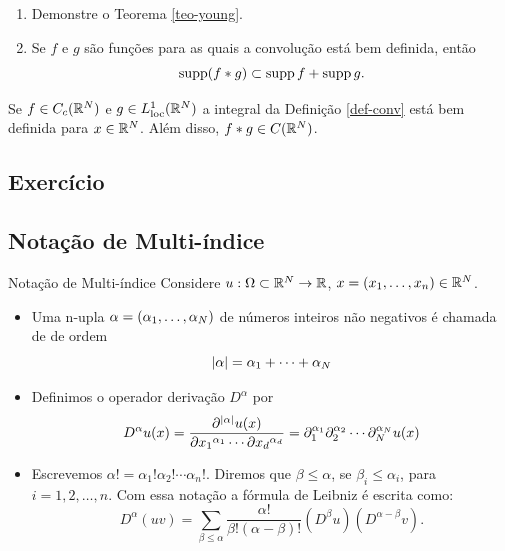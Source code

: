 \begin{frame}
	\begin{exer}
		\begin{enumerate}
			\item 		Demonstre o Teorema \ref{teo-young}.
			
			\item Se $f$ e $g$ são funções para as quais a convolução está bem definida, então 
			\[\operatorname{supp}(f\ast g)\subset \operatorname{supp} f+\operatorname{supp} g.\]
		\end{enumerate}

	\end{exer}
	
	\begin{prop}
		Se $f\in C_c(\mathbb{R}^N)$ e $g\in L_{\operatorname{loc}}^1(\mathbb{R}^N)$ a integral da Definição \ref{def-conv} está bem definida para  $x\in \mathbb{R}^N$. Além disso, $f\ast g\in C(\mathbb{R}^N)$.
	\end{prop}

\subsection*{Exercício \theexer}
\end{frame}




\subsection*{Notação de Multi-índice}
\begin{frame}{Notação de Multi-índice}
	Considere $u:\Omega\subset \mathbb{R}^N\to \mathbb{R}$, $x=(x_1,\ldots,x_n)\in \mathbb{R}^N$.
	\begin{itemize}
		\item Uma n-upla $\alpha=(\alpha_1,\ldots,\alpha_N)$ de números inteiros não negativos é chamada de  de ordem 
		\[|\alpha|=\alpha_1+\cdots+\alpha_N\]
		
		\item Definimos o operador derivação $D^\alpha$ por
		\[D^\alpha u(x)= \frac{\partial^{|\alpha|}u(x)}{\partial{x_1}^{\alpha_1} \cdots\partial{x_d}^{\alpha_d}}=\partial_1^{\alpha_1}\partial_2^{\alpha_2}\cdots\partial_N^{\alpha_N}u(x)\]
			
		\item Escrevemos  $\alpha!=\alpha_1!\alpha_2!\cdots\alpha_n!$. Diremos que $\beta\leq \alpha$, se $\beta_i\leq \alpha_i$, para $i=1,2,\ldots,n$. Com essa notação a fórmula de Leibniz é escrita como:
		\[D^\alpha(uv)=\sum_{\beta\leq \alpha}\frac{\alpha!}{\beta!(\alpha-\beta)!}(D^\beta u)(D^{\alpha-\beta} v).\]
	\end{itemize}
\end{frame}


